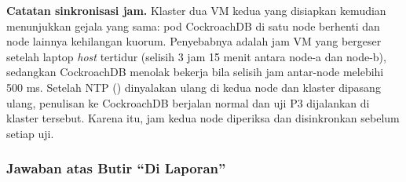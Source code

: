 \textbf{Catatan sinkronisasi jam.} Klaster dua VM kedua yang disiapkan kemudian menunjukkan gejala yang sama: pod CockroachDB di satu node berhenti dan node lainnya kehilangan kuorum. Penyebabnya adalah jam VM yang bergeser setelah laptop \textit{host} tertidur (selisih 3 jam 15 menit antara node-a dan node-b), sedangkan CockroachDB menolak bekerja bila selisih jam antar-node melebihi 500 ms. Setelah NTP () dinyalakan ulang di kedua node dan klaster dipasang ulang, penulisan ke CockroachDB berjalan normal dan uji P3 dijalankan di klaster tersebut. Karena itu, jam kedua node diperiksa dan disinkronkan sebelum setiap uji.

\subsubsection{Jawaban atas Butir ``Di Laporan''}
